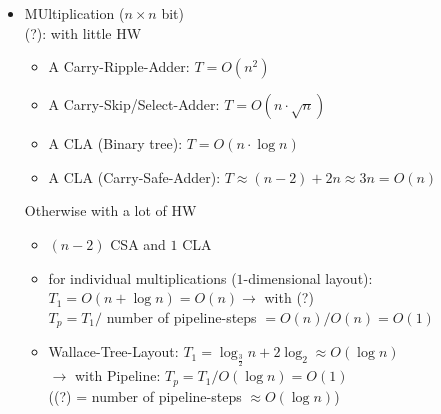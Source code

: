 \begin{itemize}
    \item MUltiplication ($n\times n$ bit) \\
    (?): with little HW
    \begin{itemize}
        \item A Carry-Ripple-Adder: $T=O(n^2)$
        \item A Carry-Skip/Select-Adder: $T=O(n\cdot \sqrt{n})$
        \item A CLA (Binary tree): $T=O(n\cdot \log n)$
        \item A CLA (Carry-Safe-Adder): $T\approx (n-2)+2n\approx 3n=O(n)$
    \end{itemize}
    Otherwise with a lot of HW \\
    \begin{itemize}
        \item $(n-2)$ CSA and $1$ CLA
        \item for individual multiplications ($1$-dimensional layout): $T_1=O(n+\log n)=O(n) \rightarrow$ with (?) \\
        $T_p=T_1/$ number of pipeline-steps $=O(n)/O(n)=O(1)$
        \item Wallace-Tree-Layout: $T_1=\log_{\frac{3}{2}} n+2\log_2 \approx O(\log n)$ \\
        $\rightarrow $ with Pipeline: $T_p=T_1/O(\log n)=O(1)$ \\
        ((?) = number of pipeline-steps $\approx O(\log n)$)
    \end{itemize}
   

\end{itemize}
